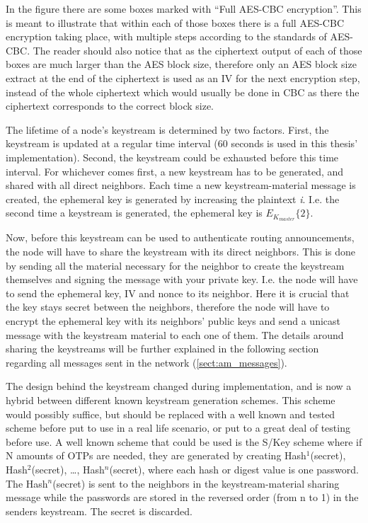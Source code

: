 In the figure there are some boxes marked with ``Full AES-CBC encryption''. This
is meant to illustrate that within each of those boxes there is a full AES-CBC
encryption taking place, with multiple steps according to the standards of
AES-CBC. The reader should also notice that as the ciphertext output of each of
those boxes are much larger than the AES block size, therefore only an AES block
size extract at the end of the ciphertext is used as an \ac{IV} for the next
encryption step, instead of the whole ciphertext which would usually be done in
CBC as there the ciphertext corresponds to the correct block size.

The lifetime of a node's keystream is determined by two factors. First, the
keystream is updated at a regular time interval (60 seconds is used in this
thesis' implementation). Second, the keystream could be exhausted before this
time interval. For whichever comes first, a new keystream has to be generated,
and shared with all direct neighbors. Each time a new keystream-material message
is created, the ephemeral key is generated by increasing the plaintext \emph{i}.
I.e. the second time a keystream is generated, the ephemeral key is
$E_{K_{master}}\{2\}$.

Now, before this keystream can be used to authenticate routing announcements,
the node will have to share the keystream with its direct neighbors. This is
done by sending all the material necessary for the neighbor to create the
keystream themselves and signing the message with your private key. I.e. the
node will have to send the ephemeral key, \ac{IV} and nonce to its neighbor.
Here it is crucial that the key stays secret between the neighbors, therefore
the node will have to encrypt the ephemeral key with its neighbors' public keys
and send a unicast message with the keystream material to each one of them. The
details around sharing the keystreams will be further explained in the
following section regarding all messages sent in the network
(\ref{sect:am_messages}).

The design behind the keystream changed during implementation, and is now a
hybrid between different known keystream generation schemes. This scheme would
possibly suffice, but should be replaced with a well known and tested scheme
before put to use in a real life scenario, or put to a great deal of testing
before use. A well known scheme that could be used is the S/Key scheme
\cite{haller1994s} where if N amounts of \acp{OTP} are needed, they are
generated by creating Hash$^1$(secret), Hash$^2$(secret), \ldots,
Hash$^n$(secret), where each hash or digest value is one password. The
Hash$^n$(secret) is sent to the neighbors in the keystream-material sharing
message while the passwords are stored in the reversed order (from n to 1) in
the senders keystream. The secret is discarded.

